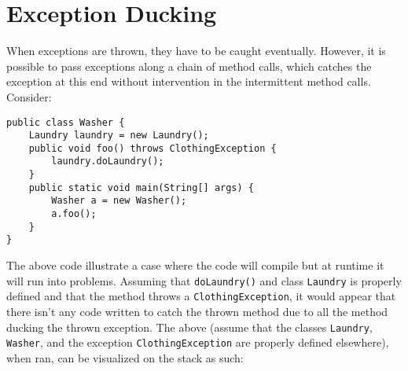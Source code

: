 \documentclass{tufte-handout}
\begin{document}
    \section*{Exception Ducking}
    When exceptions are thrown, they have to be caught eventually. However, it is possible to pass exceptions along a chain of method calls, which catches the exception at this end without intervention in the intermittent method calls. Consider:

    \begin{lstlisting}
public class Washer {
    Laundry laundry = new Laundry();
    public void foo() throws ClothingException {
        laundry.doLaundry();
    }
    public static void main(String[] args) {
        Washer a = new Washer();
        a.foo(); 
    }
}
    \end{lstlisting}

    The above code illustrate a case where the code will compile but at runtime it will run into problems. Assuming that \texttt{doLaundry()} and class \texttt{Laundry} is properly defined and that the method throws a \texttt{ClothingException}, it would appear that there isn't any code written to catch the thrown method due to all the method ducking the thrown exception. The above (assume that the classes \texttt{Laundry}, \texttt{Washer}, and the exception \texttt{ClothingException} are properly defined elsewhere), when ran, can be visualized on the stack as such:

    \begin{center}
    \end{center}
\end{document}
